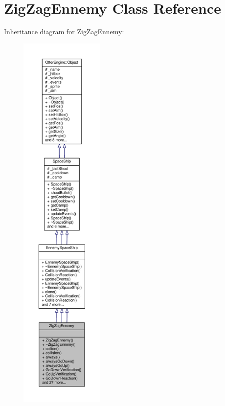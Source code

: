 \hypertarget{class_zig_zag_ennemy}{}\section{Zig\+Zag\+Ennemy Class Reference}
\label{class_zig_zag_ennemy}


Inheritance diagram for Zig\+Zag\+Ennemy\+:\nopagebreak
\begin{figure}[H]
\begin{center}
\leavevmode
\includegraphics[height=550pt]{d7/d70/class_zig_zag_ennemy__inherit__graph}
\end{center}
\end{figure}


